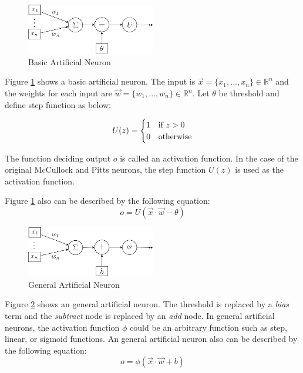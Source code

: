 \documentclass[draft,dvipsnames]{drexel-thesis}
\begin{document}
\begin{thesis}
\begin{figure}[tb]
    \centering
    \includegraphics[width=0.5\textwidth]{pictures/figures/basic_AN.png}
    \caption{Basic Artificial Neuron}
    \label{fig:basic_AN}
\end{figure}

Figure \ref{fig:basic_AN} shows a basic artificial neuron. The input is $\vec{x} = \{x_1, ..., x_n\} \in \mathbb{R}^n$ and the weights for each input are $\vec{w} = \{w_1, ..., w_n\} \in \mathbb{R}^n$. Let $\theta$ be threshold and define step function as below:

$$U(z)=
	\begin{cases}
		\hfill 1 \hfill & \text{if $z > 0$} \\
		\hfill 0 \hfill & \text{otherwise} \\
	\end{cases}
$$

The function deciding output $o$ is called an activation function. In the case of the original McCullock and Pitts neurons, the step function $U(z)$ is used as the activation function.

Figure \ref{fig:basic_AN} also can be described by the following equation:
$$ o = U(\vec{x}\cdot\vec{w}-\theta)$$

\begin{figure}[t!]
    \centering
    \includegraphics[width=0.5\textwidth]{pictures/figures/general_AN.png}
    \caption{General Artificial Neuron}
    \label{fig:general_AN}
\end{figure}

Figure \ref{fig:general_AN} shows an general artificial neuron. The threshold is replaced by a {\em bias} term and the {\em subtract} node is replaced by an {\em add} node. In general artificial neurons, the activation function $\phi$ could be an arbitrary function such as step, linear, or sigmoid functions. An general artificial neuron also can be described by the following equation:
$$o = \phi(\vec{x}\cdot\vec{w}+b)$$



\end{thesis}
\end{document}
